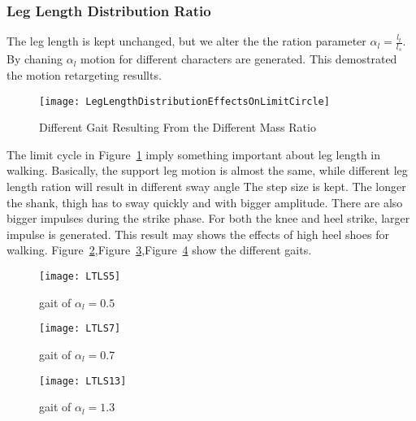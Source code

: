 \subsubsection*{Leg Length Distribution Ratio}
The leg length is kept unchanged, but we alter the the ration parameter $\alpha_l=\frac{l_t}{l_s}$.
By chaning $\alpha_l$ motion for different characters are generated.
This demostrated the motion retargeting resullts.


\begin{figure}[!htbp]
  \begin{center}
      \texttt{[image: LegLengthDistributionEffectsOnLimitCircle]}
    \caption{Different Gait Resulting From the Different Mass Ratio}
    \label{fig:differentlr}
\end{center}
\end{figure}

The limit cycle in Figure~\ref{fig:differentlr} imply something important about leg length in walking.
Basically, the support leg motion is almost the same, while different leg length ration will result in different sway angle
The step size is kept.
The longer the shank, thigh has to sway quickly and with bigger amplitude.
There are also bigger impulses during the strike phase. 
For both the knee and heel strike, larger impulse is generated.
This result may shows the effects of high heel shoes for walking.
Figure~\ref{fig:lr1},Figure~\ref{fig:lr2},Figure~\ref{fig:lr3} show the different gaits.



\begin{figure}[!htbp]
  \begin{center}
      \texttt{[image: LTLS5]}
    \caption{gait of $\alpha_l=0.5$}
    \label{fig:lr1}
\end{center}
\end{figure}

\begin{figure}[!htbp]
  \begin{center}
      \texttt{[image: LTLS7]}
    \caption{gait of $\alpha_l=0.7$}
    \label{fig:lr2}
\end{center}
\end{figure}

\begin{figure}[!htbp]
  \begin{center}
      \texttt{[image: LTLS13]}
    \caption{gait of $\alpha_l=1.3$}
    \label{fig:lr3}
\end{center}
\end{figure}




